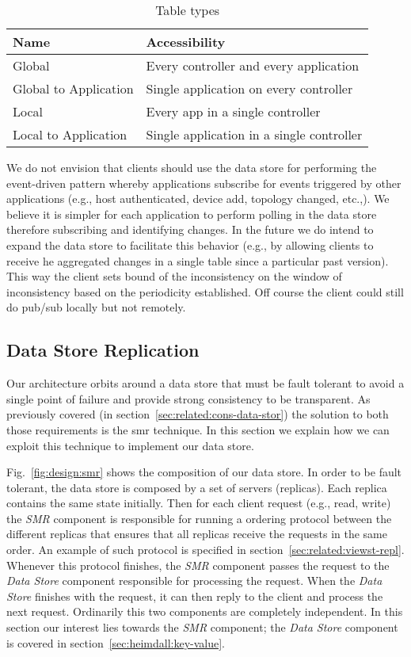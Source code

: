 \begin{table}[ht]
  \centering
  \begin{tabular}{ll}
    Name & Accessibility \\ \toprule 
    Global & Every controller and every application   \\ 
    Global to Application & Single application on every controller \\
    Local & Every app in a single controller \\
    Local to Application &  Single application in a single controller \\ \bottomrule 
  \end{tabular}
  \caption{Table types}
  \label{tab:table-types}
\end{table}

We do not envision that clients should use the data store for performing the event-driven pattern whereby applications subscribe for events triggered by other applications (e.g., host authenticated, device add, topology changed, etc.,). We believe it is simpler for each application to perform polling in the data store therefore subscribing and identifying changes. In the future we do intend to expand the data store to facilitate this behavior (e.g., by allowing clients to receive he aggregated changes in a single table since a particular past version).
This way the client sets bound of the inconsistency on the window of inconsistency based on the periodicity established. Off course the client could still do pub/sub locally but not remotely. 


\subsection{Data Store Replication}
\label{sec:design:data-store-repl}

Our architecture orbits around a data store that must be fault tolerant to avoid a single point of failure and provide strong consistency to be transparent. 
As previously covered (in section~\ref{sec:related:cons-data-stor}) the solution to both those requirements is the \gls{smr}  technique. 
In this section we explain how we can exploit this technique to implement our data store. 

Fig.~\ref{fig:design:smr} shows the composition of our data store. 
In order to be fault tolerant, the data store is composed by a set of servers (replicas). Each replica contains the same state initially. 
Then for each client request (e.g., read, write)  the \emph{SMR} component is responsible for running a ordering protocol between the different replicas that ensures that all replicas receive the requests in the same order.
 An example of such protocol is specified in  section~\ref{sec:related:viewst-repl}. Whenever this protocol finishes, the \emph{SMR} component passes the request to the \emph{Data Store} component responsible for processing the request. 
When the \emph{Data Store} finishes with the request, it can then reply to the client and process the next request.
Ordinarily this two components are completely independent.  In this section our interest lies towards the \emph{SMR} component; the \emph{Data Store} component is covered in section~\ref{sec:heimdall:key-value}. 

